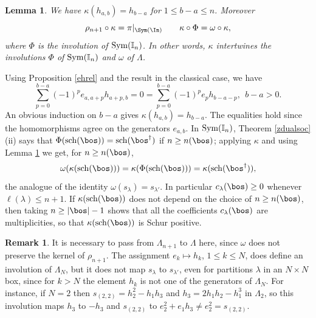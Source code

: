 \documentclass[11pt,reqno]{amsart}
\newtheorem*{lem}{Lemma}
\theoremstyle{definition} \newtheorem*{defn}{Definition}
\theoremstyle{definition}
\newtheorem*{rem}{Remark}
\newenvironment{pf}{\proof}{\endproof}
\numberwithin{equation}{section}
\begin{document}
\begin{lem}\label{kappa} We have $\kappa(h_{a,b})=h_{b-a}$ for $1\le b-a\le n$. Moreover
$$\rho_{n+1}\circ\kappa=\pi|_{\Sym(\In)}\qquad \kappa\circ\Phi=\omega\circ\kappa,$$
where $\Phi$ is the involution of ${\rm Sym}(\mathbb I_n)$. In other words, $\kappa$ intertwines the involutions $\Phi$ of
${\rm Sym}(\mathbb I_n)$ and $\omega$ of $\Lambda$.
\end{lem}
\begin{pf} Using  Proposition \ref{ehrel} and the result in the classical case, we have
$$\sum_{p=0}^{b-a}(-1)^pe_{a,a+p}h_{a+p,b}=0= \sum_{p=0}^{b-a}(-1)^p e_ph_{b-a-p},\ \ b-a>0. $$ An obvious induction on $b-a$ gives $\kappa(h_{a,b})=h_{b-a}$. The equalities hold since the homomorphisms  agree on the generators $e_{a,b}$.
\end{pf}
\noindent In ${\rm Sym}(\mathbb I_n)$, Theorem \ref{zdualsoc}(ii)
says that $\Phi({\rm sch}(\bos))={\rm sch}(\bos^\dagger)$ if $n\ge n(\bos)$; applying $\kappa$ and using Lemma \ref{kappa} we get, for
$n\ge n(\bos)$,
\begin{equation}\label{omegas}\omega(\kappa({\rm sch}(\bos)))=\kappa(\Phi({\rm sch}(\bos)))=\kappa({\rm sch}(\bos^\dagger)),\end{equation}
the analogue of the identity $\omega(s_\lambda)=s_{\lambda'}$. \noindent In particular $c_\lambda(\bos)\ge0$ whenever $\ell(\lambda)\le n+1$. If $\kappa({\rm sch}(\bos))$ does not depend on the choice of $n\ge n(\bos)$, then
taking $n\ge|\bos|-1$ shows that all the coefficients $c_\lambda(\bos)$ are multiplicities, so that $\kappa({\rm sch}(\bos))$ is Schur positive.


\begin{rem} It is necessary to pass from $\Lambda_{n+1}$ to $\Lambda$ here, since $\omega$ does not preserve the kernel of $\rho_{n+1}$.
The assignment $e_k\mapsto h_k$, $1\le k\le N$, does define an involution of $\Lambda_N$, but it does not map $s_\lambda$ to $s_{\lambda'}$,
even for partitions $\lambda$ in an $N\times N$ box, since for $k>N$ the element $h_k$ is not one of the generators of
$\Lambda_N$. For instance, if $N=2$ then $s_{(2,2)}=h_2^2-h_1h_3$ and $h_3=2h_1h_2-h_1^3$ in $\Lambda_2$, so this involution maps $h_3$
to $-h_3$ and $s_{(2,2)}$ to $e_2^2+e_1h_3\ne e_2^2=s_{(2,2)}$.
\end{rem}
\end{document}
